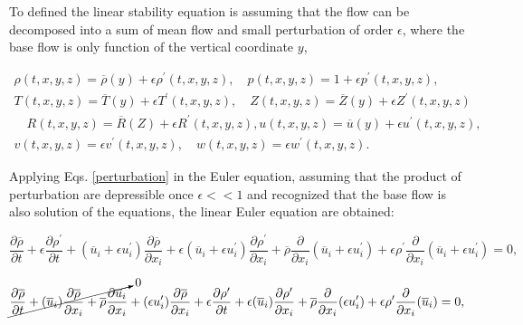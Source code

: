 To defined the linear stability equation is assuming that 
the flow can be decomposed  into  a sum of mean flow and 
small perturbation of order $\epsilon$, where the base flow 
is only function of the vertical coordinate $y$,  

\begin{equation}
\begin{split}
   \rho(t,x,y,z)=\overline{\rho}(y)+\epsilon\rho^\prime(t,x,y,z) 
   ,
   \quad
   p(t,x,y,z)=1+\epsilon p^\prime(t,x,y,z) 
   ,
   \\
   T(t,x,y,z)=\overline{T}(y)+\epsilon T^\prime(t,x,y,z) 
   ,
   \quad
   Z(t,x,y,z)=\overline{Z}(y)+\epsilon Z^\prime(t,x,y,z) 
    \\
   \quad
   R(t,x,y,z)=\overline{R}(Z)+\epsilon R^\prime(t,x,y,z) 
   ,
   u(t,x,y,z)=\overline{u}(y)+\epsilon u^\prime(t,x,y,z) 
   ,
   \quad
   \\
   v(t,x,y,z)=\epsilon v^\prime(t,x,y,z) 
   ,
   \quad
   w(t,x,y,z)=\epsilon w^\prime(t,x,y,z) 
   .
\end{split}
\label{perturbation}
\end{equation}

Applying Eqs. \ref{perturbation} in the Euler equation,  
assuming that the product of perturbation are depressible once $\epsilon<<1$ 
and recognized that the base flow is also solution of the equations, the 
linear Euler equation are obtained:

\begin{equation*} 
\frac{\partial \overline{\rho}}{\partial t}
+
\epsilon
\frac{\partial\rho^{\prime}}{\partial t}
+
(\overline{u}_i+\epsilon u^{\prime}_i)
\frac{\partial \overline{\rho}}{\partial x_i} 
+
\epsilon
(\overline{u}_i+\epsilon u^{\prime}_i)
\frac{\partial \rho^{\prime}}{\partial x_i} 
+
\overline{\rho}
\frac{\partial}{\partial x_i}
(\overline{u}_i+\epsilon u^{\prime}_i)
+
\epsilon
\rho^{\prime}
\frac{\partial }{\partial x_i}
(\overline{u}_i+\epsilon u^{\prime}_i)
=
0
,
\end{equation*} 

\begin{equation*} 
\cancelto{0}{
\frac{\partial \overline{\rho}}{\partial t}
+
(\overline{u}_i)
\frac{\partial \overline{\rho}}{\partial x_i} 
+
\overline{\rho}
\frac{\partial\overline{u}_i}{\partial x_i}
}
+
(\epsilon u^{\prime}_i)
\frac{\partial \overline{\rho}}{\partial x_i} 
+
\epsilon
\frac{\partial\rho^{\prime}}{\partial t}
+
\epsilon
(\overline{u}_i)
\frac{\partial \rho^{\prime}}{\partial x_i} 
+
\overline{\rho}
\frac{\partial}{\partial x_i}
(\epsilon u^{\prime}_i)
+
\epsilon
\rho^{\prime}
\frac{\partial }{\partial x_i}
(\overline{u}_i)
=
0
,
\end{equation*} 


